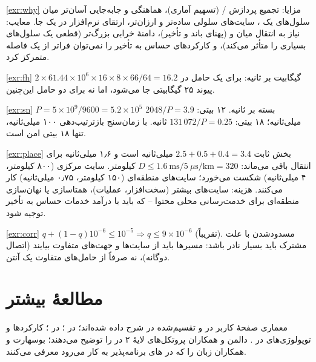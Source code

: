 \documentclass[11pt,a4paper]{article}
\begin{document}
\begin{solutionbox}{\ref{exr:why}}
مزایا: تجمیع پردازش / (تسهیم آماری)، هماهنگی و جابه‌جایی آسان‌تر میان سلول‌های یک ، سایت‌های سلولی ساده‌تر و ارزان‌تر،
ارتقای نرم‌افزار در یک جا. معایب: نیاز به انتقال میان  و  (پهنای باند و تأخیر)، دامنهٔ خرابی بزرگ‌تر (قطعی یک  سلول‌های بسیاری
را متأثر می‌کند)، و کارکردهای حساس به تأخیر را نمی‌توان فراتر از یک فاصله متمرکز کرد.
\end{solutionbox}

\begin{solutionbox}{\ref{exr:fh}}
$2\times61.44\times10^6\times16\times8\times66/64 = 16.2$ گیگابیت بر ثانیه: برای یک حامل در پیوند ۲۵ گیگابیتی جا می‌شود، اما نه برای دو حامل
این‌چنین.
\end{solutionbox}

\begin{solutionbox}{\ref{exr:sn}}
$P = 5\times10^9/9600 = 5.2\times10^5$ بسته بر ثانیه. ۱۲ بیتی: $2048/P = 3.9$ میلی‌ثانیه؛ ۱۸ بیتی: $131\,072/P = 0.25$ ثانیه. با زمان‌سنج بازترتیب‌دهی
۱۰۰ میلی‌ثانیه، تنها  ۱۸ بیتی امن است.
\end{solutionbox}

\begin{solutionbox}{\ref{exr:place}}
بخش ثابت $2.5 + 0.5 + 0.4 = 3.4$ میلی‌ثانیه است و ۱٫۶ میلی‌ثانیه برای انتقال باقی می‌ماند: $D \le 1.6\ \text{ms}/5\ \mu\text{s/km} = 320$ کیلومتر.
سایت مرکزی (۸۰۰ کیلومتر، ۴ میلی‌ثانیه) شکست می‌خورد؛ سایت‌های منطقه‌ای (۱۵۰ کیلومتر، ۰٫۷۵ میلی‌ثانیه) کار می‌کنند. هزینه: سایت‌های  بیشتر
(سخت‌افزار، عملیات)، همتاسازی یا نهان‌سازی منطقه‌ای برای خدمت‌رسانی محلی محتوا -- که باید با درآمد خدمات حساس به تأخیر توجیه شود.
\end{solutionbox}

\begin{solutionbox}{\ref{exr:corr}}
$q + (1-q)10^{-6} \le 10^{-5} \Rightarrow q \le 9\times10^{-6}$ (تقریباً). مسدودشدن با علت مشترک باید بسیار نادر باشد: مسیرها باید از سایت‌ها و
جهت‌های متفاوت بیایند (اتصال دوگانه)، نه صرفاً از حامل‌های متفاوت یک آنتن.
\end{solutionbox}

\section{مطالعهٔ بیشتر}
معماری صفحهٔ کاربر  در  \cite{ts38300} و  تقسیم‌شده در  \cite{ts38401} شرح داده شده‌اند؛  در
 \cite{ts29244}؛  در  \cite{ts29281}؛ کارکردها و توپولوژی‌های  در  \cite{ts23501}. دالمن و
همکاران \cite{dahlman2020nr} پروتکل‌های لایهٔ ۲ در  را توضیح می‌دهند؛ بوسهارت و همکاران \cite{bosshart2014p4} زبان  را که در
های برنامه‌پذیر به کار می‌رود معرفی می‌کنند.

\begin{latin}
\printbibliography[heading=subbibliography,title={References}]
\end{latin}
\end{document}
